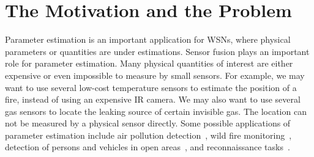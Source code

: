 %
%

\section{The Motivation and the Problem}
Parameter estimation is an important application for WSNs, where physical parameters or quantities are under estimations. Sensor fusion plays an important role for parameter estimation. Many physical quantities of interest are either expensive or even impossible to measure by small sensors. For example, we may want to use several low-cost temperature sensors to estimate the position of a fire, instead of using an expensive IR camera. We may also want to use several gas sensors to locate the leaking source of certain invisible gas. The location can not be measured by a physical sensor directly.
    Some possible applications of parameter estimation include air pollution detection~\cite{LiuDualSpaceAppTracking}, wild fire
monitoring~\cite{DoolinaFirebugSPIE05}, detection of persons and
vehicles in open areas~\cite{DuttamirMote}, and reconnaissance
tasks~\cite{zhao03collaborative}.


